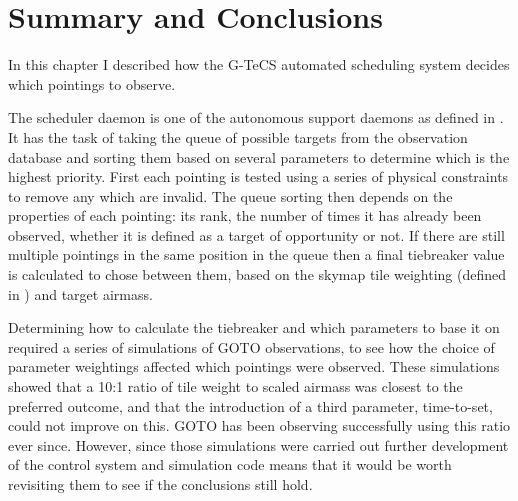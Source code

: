
\section{Summary and Conclusions}
\label{sec:scheduling_conclusion}


\begin{colsection}

In this chapter I described how the G-TeCS automated scheduling system decides which pointings to observe.

The scheduler daemon is one of the autonomous support daemons as defined in . It has the task of taking the queue of possible targets from the observation database and sorting them based on several parameters to determine which is the highest priority. First each pointing is tested using a series of physical constraints to remove any which are invalid. The queue sorting then depends on the properties of each pointing: its rank, the number of times it has already been observed, whether it is defined as a target of opportunity or not. If there are still multiple pointings in the same position in the queue then a final tiebreaker value is calculated to chose between them, based on the skymap tile weighting (defined in ) and target airmass.

Determining how to calculate the tiebreaker and which parameters to base it on required a series of simulations of GOTO observations, to see how the choice of parameter weightings affected which pointings were observed. These simulations showed that a 10:1 ratio of tile weight to scaled airmass was closest to the preferred outcome, and that the introduction of a third parameter, time-to-set, could not improve on this. GOTO has been observing successfully using this ratio ever since. However, since those simulations were carried out further development of the control system and simulation code means that it would be worth revisiting them to see if the conclusions still hold.

\end{colsection}


